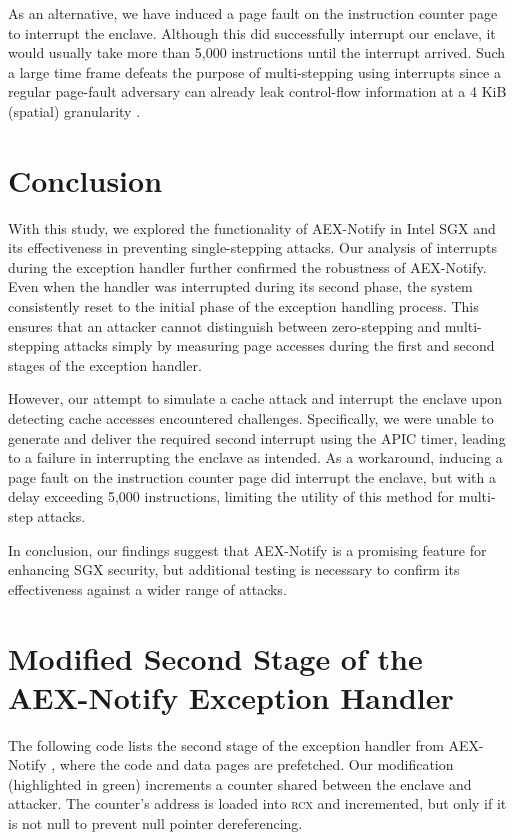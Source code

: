 \documentclass{llncs}
\begin{document}
As an alternative, we have induced a page fault on the instruction counter page
to interrupt the enclave.
Although this did successfully interrupt our enclave, it would usually take
more than 5,000 instructions until the interrupt arrived.
Such a large time frame defeats the purpose of multi-stepping using interrupts
since a regular page-fault adversary can already leak control-flow information
at a 4 KiB (spatial) granularity \cite{XuCP15}.

\section{Conclusion}

With this study, we explored the functionality of AEX-Notify in Intel SGX and
its effectiveness in preventing single-stepping attacks.
Our analysis of interrupts during the exception handler further confirmed the
robustness of AEX-Notify.
Even when the handler was interrupted during its second phase, the system
consistently reset to the initial phase of the exception handling process.
This ensures that an attacker cannot distinguish between zero-stepping and
multi-stepping attacks simply by measuring page accesses during the first and
second stages of the exception handler.

However, our attempt to simulate a cache attack and interrupt the enclave upon
detecting cache accesses encountered challenges.
Specifically, we were unable to generate and deliver the required second
interrupt using the APIC timer, leading to a failure in interrupting the
enclave as intended.
As a workaround, inducing a page fault on the instruction counter page did
interrupt the enclave, but with a delay exceeding 5,000 instructions, limiting
the utility of this method for multi-step attacks.

In conclusion, our findings suggest that AEX-Notify is a promising feature for
enhancing SGX security, but additional testing is necessary to confirm its
effectiveness against a wider range of attacks.


%


\clearpage
\appendix

\section{Modified Second Stage of the AEX-Notify Exception Handler}
\label{apx:modification}

The following code lists the second stage of the exception handler from
AEX-Notify \cite{ConstableBCXXAK23}, where the code and data pages are
prefetched.
Our modification (highlighted in green) increments a counter shared between the
enclave and attacker.
The counter's address is loaded into \textsc{rcx} and incremented, but only if
it is not null to prevent null pointer dereferencing.
\end{document}
